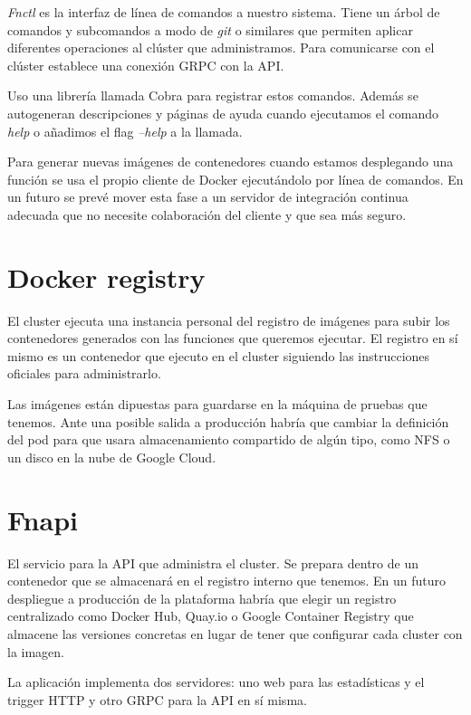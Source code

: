 \emph{Fnctl} es la interfaz de línea de comandos a nuestro sistema. Tiene un árbol de comandos y subcomandos a modo de \emph{git} o similares que permiten aplicar diferentes operaciones al clúster que administramos. Para comunicarse con el clúster establece una conexión GRPC con la API.

Uso una librería llamada Cobra\cite{cobra} para registrar estos comandos. Además se autogeneran descripciones y páginas de ayuda cuando ejecutamos el comando \emph{help} o añadimos el flag \emph{--help} a la llamada.

Para generar nuevas imágenes de contenedores cuando estamos desplegando una función se usa el propio cliente de Docker ejecutándolo por línea de comandos. En un futuro se prevé mover esta fase a un servidor de integración continua adecuada que no necesite colaboración del cliente y que sea más seguro.

\section{Docker registry}

El cluster ejecuta una instancia personal del registro de imágenes para subir los contenedores generados con las funciones que queremos ejecutar. El registro en sí mismo es un contenedor que ejecuto en el cluster siguiendo las instrucciones oficiales\cite{registrydeploy} para administrarlo.

Las imágenes están dipuestas para guardarse en la máquina de pruebas que tenemos. Ante una posible salida a producción habría que cambiar la definición del pod para que usara almacenamiento compartido de algún tipo, como NFS o un disco en la nube de Google Cloud.

\section{Fnapi}

El servicio para la API que administra el cluster. Se prepara dentro de un contenedor que se almacenará en el registro interno que tenemos. En un futuro despliegue a producción de la plataforma habría que elegir un registro centralizado como Docker Hub, Quay.io o Google Container Registry que almacene las versiones concretas en lugar de tener que configurar cada cluster con la imagen.

La aplicación implementa dos servidores: uno web para las estadísticas y el trigger HTTP y otro GRPC para la API en sí misma.

